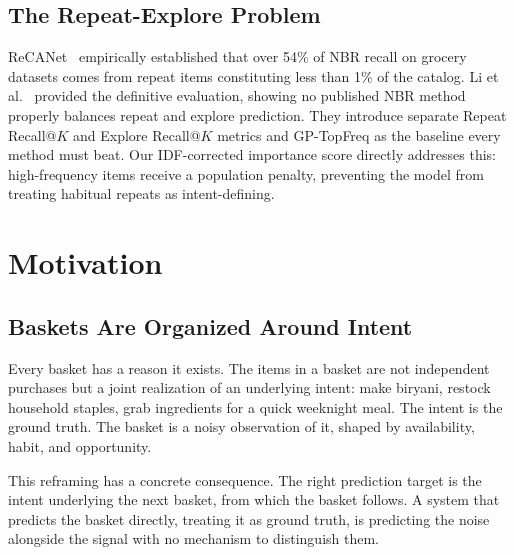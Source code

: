 \documentclass[conference]{IEEEtran}
\begin{document}
\subsection{The Repeat-Explore Problem}

ReCANet~\cite{ariannezhad2022recanet} empirically established that
over 54\% of NBR recall on grocery datasets comes from repeat items
constituting less than 1\% of the catalog. Li et al.~\cite{li2023next}
provided the definitive evaluation, showing no published NBR method
properly balances repeat and explore prediction. They introduce separate
Repeat Recall@$K$ and Explore Recall@$K$ metrics and GP-TopFreq as the
baseline every method must beat. Our IDF-corrected importance score
directly addresses this: high-frequency items receive a population
penalty, preventing the model from treating habitual repeats as
intent-defining.




\section{Motivation}
\label{sec:motivation}

\subsection{Baskets Are Organized Around Intent}

Every basket has a reason it exists. The items in a basket are not
independent purchases but a joint realization of an underlying intent:
make biryani, restock household staples, grab ingredients for a quick
weeknight meal. The intent is the ground truth. The basket is a noisy
observation of it, shaped by availability, habit, and opportunity.

This reframing has a concrete consequence. The right prediction target
is the intent underlying the next basket, from which the basket follows.
A system that predicts the basket directly, treating it as ground truth,
is predicting the noise alongside the signal with no mechanism to
distinguish them.
\end{document}
